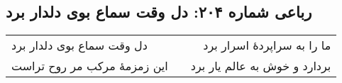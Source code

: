 \begin{center}
\section*{رباعی شماره ۲۰۴: دل وقت سماع بوی دلدار برد}
\label{sec:sh204}
\begin{longtable}{l p{0.5cm} r}
دل وقت سماع بوی دلدار برد
&&
ما را به سراپردهٔ اسرار برد
\\
این زمزمهٔ مرکب مر روح تراست
&&
بردارد و خوش به عالم یار برد
\\
\end{longtable}
\end{center}
